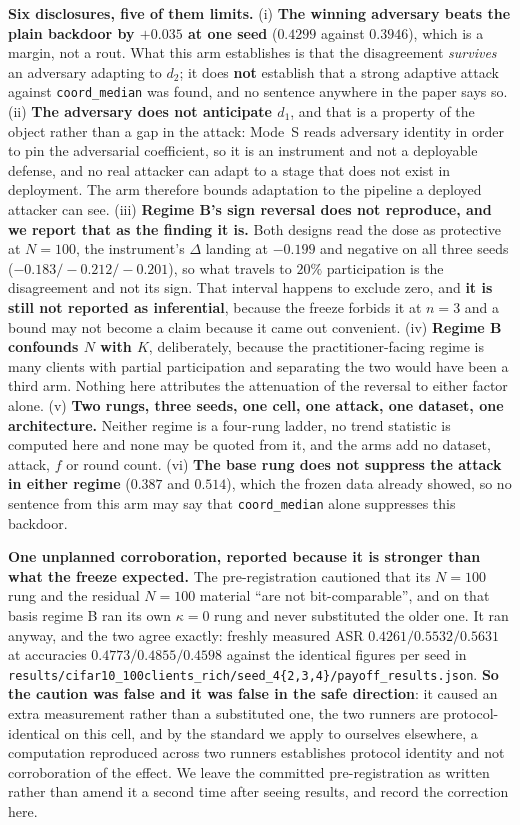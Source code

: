 \documentclass{article}
\begin{document}
\textbf{Six disclosures, five of them limits.} (i) \textbf{The winning adversary beats the plain backdoor by $+0.035$ at one seed} ($0.4299$ against $0.3946$), which is a margin, not a rout. What this arm establishes is that the disagreement \emph{survives} an adversary adapting to $d_2$; it does \textbf{not} establish that a strong adaptive attack against \texttt{coord\_median} was found, and no sentence anywhere in the paper says so. (ii) \textbf{The adversary does not anticipate $d_1$}, and that is a property of the object rather than a gap in the attack: Mode~S reads adversary identity in order to pin the adversarial coefficient, so it is an instrument and not a deployable defense, and no real attacker can adapt to a stage that does not exist in deployment. The arm therefore bounds adaptation to the pipeline a deployed attacker can see. (iii) \textbf{Regime B's sign reversal does not reproduce, and we report that as the finding it is.} Both designs read the dose as protective at $N{=}100$, the instrument's $\Delta$ landing at $-0.199$ and negative on all three seeds ($-0.183/-0.212/-0.201$), so what travels to $20\%$ participation is the disagreement and not its sign. That interval happens to exclude zero, and \textbf{it is still not reported as inferential}, because the freeze forbids it at $n{=}3$ and a bound may not become a claim because it came out convenient. (iv) \textbf{Regime B confounds $N$ with $K$}, deliberately, because the practitioner-facing regime is many clients with partial participation and separating the two would have been a third arm. Nothing here attributes the attenuation of the reversal to either factor alone. (v) \textbf{Two rungs, three seeds, one cell, one attack, one dataset, one architecture.} Neither regime is a four-rung ladder, no trend statistic is computed here and none may be quoted from it, and the arms add no dataset, attack, $f$ or round count. (vi) \textbf{The base rung does not suppress the attack in either regime} ($0.387$ and $0.514$), which the frozen data already showed, so no sentence from this arm may say that \texttt{coord\_median} alone suppresses this backdoor.

\textbf{One unplanned corroboration, reported because it is stronger than what the freeze expected.} The pre-registration cautioned that its $N{=}100$ rung and the residual $N{=}100$ material ``are not bit-comparable'', and on that basis regime B ran its own $\kappa{=}0$ rung and never substituted the older one. It ran anyway, and the two agree exactly: freshly measured ASR $0.4261/0.5532/0.5631$ at accuracies $0.4773/0.4855/0.4598$ against the identical figures per seed in \texttt{results/\allowbreak cifar10\_100clients\_rich/\allowbreak seed\_4\{2,3,4\}/\allowbreak payoff\_results.json}. \textbf{So the caution was false and it was false in the safe direction}: it caused an extra measurement rather than a substituted one, the two runners are protocol-identical on this cell, and by the standard we apply to ourselves elsewhere, a computation reproduced across two runners establishes protocol identity and not corroboration of the effect. We leave the committed pre-registration as written rather than amend it a second time after seeing results, and record the correction here.
\end{document}
